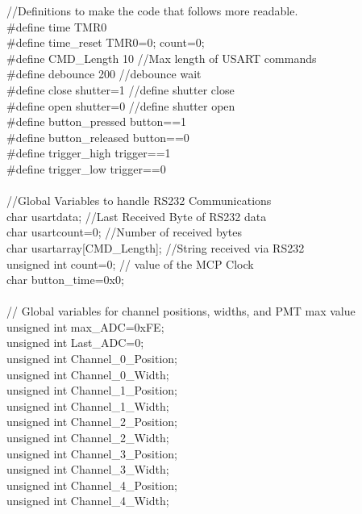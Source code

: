 //Definitions to make the code that follows more readable.\\
\#define time TMR0\\
\#define time\_reset TMR0=0; count=0;\\
\#define CMD\_Length 10 			\tabto*{7.5cm}//Max length of USART commands\\
\#define debounce 200  			\tabto*{7.5cm}//debounce wait \\
\#define close shutter=1  		\tabto*{7.5cm}//define shutter close\\
\#define open shutter=0  	\tabto*{7.5cm}	//define shutter open\\
\#define button\_pressed button==1\\
\#define button\_released button==0\\
\#define trigger\_high trigger==1\\
\#define trigger\_low trigger==0\\\\
//Global Variables to handle RS232 Communications\\
char usartdata;  			\tabto*{7.5cm}//Last Received Byte of RS232 data\\
char usartcount=0;  		\tabto*{7.5cm}//Number of received bytes\\
char usartarray[CMD\_Length];	\tabto*{7.5cm}//String received via RS232\\
unsigned int count=0;  	\tabto*{7.5cm}// value of the MCP Clock\\
char button\_time=0x0;\\
\\
//  Global variables for channel positions, widths, and PMT max value\\
unsigned int max\_ADC=0xFE;\\
unsigned int Last\_ADC=0;\\
unsigned int Channel\_0\_Position;\\
unsigned int Channel\_0\_Width;\\
unsigned int Channel\_1\_Position;\\
unsigned int Channel\_1\_Width;\\
unsigned int Channel\_2\_Position;\\
unsigned int Channel\_2\_Width;\\
unsigned int Channel\_3\_Position;\\
unsigned int Channel\_3\_Width;\\
unsigned int Channel\_4\_Position;\\
unsigned int Channel\_4\_Width;\\
\\

